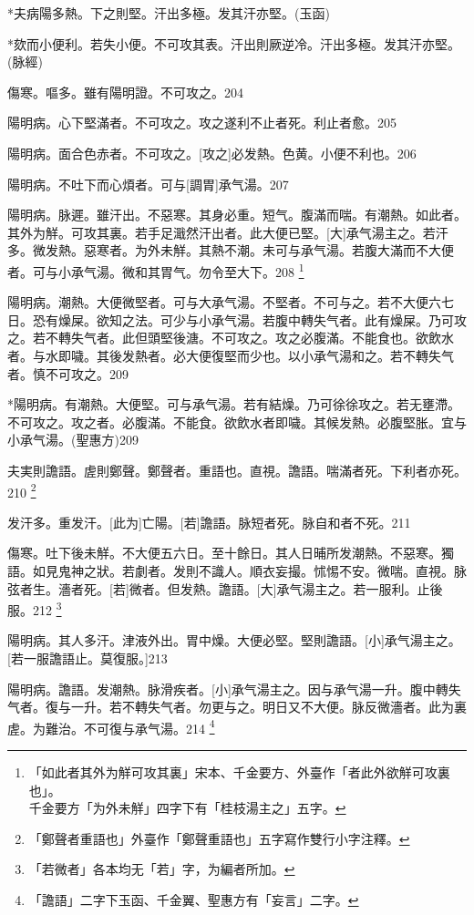 \documentclass[12pt,twoside,UTF8,b5paper]{ctexbook}
\begin{document}
*夫病陽多熱。下之則堅。汗出多極。发其汗亦堅。(玉函)

*欬而小便利。若失小便。不可攻其表。汗出則厥逆冷。汗出多極。发其汗亦堅。(脉經)

傷寒。嘔多。雖有陽明證。不可攻之。204

陽明病。心下堅滿者。不可攻之。攻之遂利不止者死。利止者愈。205

陽明病。面合色赤者。不可攻之。[攻之]必发熱。色黄。小便不利也。206

陽明病。不吐下而心煩者。可与[調胃]承气湯。207

陽明病。脉遲。雖汗出。不惡寒。其身必重。短气。腹滿而喘。有潮熱。如此者。其外为觧。可攻其裏。若手足濈然汗出者。此大便已堅。[大]承气湯主之。若汗多。微发熱。惡寒者。为外未觧。其熱不潮。未可与承气湯。若腹大滿而不大便者。可与小承气湯。微和其胃气。勿令至大下。208
	\footnote{「如此者其外为觧可攻其裏」宋本、千金要方、外臺作「者此外欲觧可攻裏也」。\\千金要方「为外未觧」四字下有「桂枝湯主之」五字。}

陽明病。潮熱。大便微堅者。可与大承气湯。不堅者。不可与之。若不大便六七日。恐有燥屎。欲知之法。可少与小承气湯。若腹中轉失气者。此有燥屎。乃可攻之。若不轉失气者。此但頭堅後溏。不可攻之。攻之必腹滿。不能食也。欲飲水者。与水即噦。其後发熱者。必大便復堅而少也。以小承气湯和之。若不轉失气者。慎不可攻之。209

*陽明病。有潮熱。大便堅。可与承气湯。若有結燥。乃可徐徐攻之。若无壅滯。不可攻之。攻之者。必腹滿。不能食。欲飲水者即噦。其候发熱。必腹堅胀。宜与小承气湯。(聖惠方)209

夫実則譫語。虗則鄭聲。鄭聲者。重語也。直視。譫語。喘滿者死。下利者亦死。210
	\footnote{「鄭聲者重語也」外臺作「鄭聲重語也」五字寫作雙行小字注釋。}

发汗多。重发汗。[此为]亡陽。[若]譫語。脉短者死。脉自和者不死。211

傷寒。吐下後未觧。不大便五六日。至十餘日。其人日晡所发潮熱。不惡寒。獨語。如見鬼神之狀。若劇者。发則不識人。順衣妄撮。怵惕不安。微喘。直視。脉弦者生。濇者死。[若]微者。但发熱。譫語。[大]承气湯主之。若一服利。止後服。212
	\footnote{「若微者」各本均无「若」字，为編者所加。}

陽明病。其人多汗。津液外出。胃中燥。大便必堅。堅則譫語。[小]承气湯主之。[若一服譫語止。莫復服。]213

陽明病。譫語。发潮熱。脉滑疾者。[小]承气湯主之。因与承气湯一升。腹中轉失气者。復与一升。若不轉失气者。勿更与之。明日又不大便。脉反微濇者。此为裏虗。为難治。不可復与承气湯。214
	\footnote{「譫語」二字下玉函、千金翼、聖惠方有「妄言」二字。}
\end{document}
